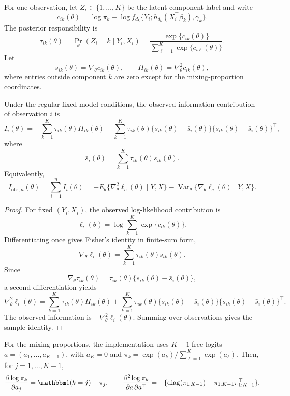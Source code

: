 For one observation, let \(Z_i\in\{1,\ldots,K\}\) be the latent component label
and write
\[
    c_{ik}(\theta)
    =
    \log \pi_k+\log f_{d_k}\{Y_i;h_{d_k}(X_i^\top\beta_k),\gamma_k\}.
\]
The posterior responsibility is
\[
    \tau_{ik}(\theta)
    =
    \Pr_\theta(Z_i=k\mid Y_i,X_i)
    =
    \frac{\exp\{c_{ik}(\theta)\}}
    {\sum_{\ell=1}^K\exp\{c_{i\ell}(\theta)\}}.
\]
Let
\[
    s_{ik}(\theta)=\nabla_\theta c_{ik}(\theta),
    \qquad
    H_{ik}(\theta)=\nabla_\theta^2 c_{ik}(\theta),
\]
where entries outside component \(k\) are zero except for the
mixing-proportion coordinates.

\begin{theorem}
\label{thm:louis}
Under the regular fixed-model conditions, the observed information contribution
of observation \(i\) is
\[
    I_i(\theta)
    =
    -\sum_{k=1}^K\tau_{ik}(\theta)H_{ik}(\theta)
    -
    \sum_{k=1}^K\tau_{ik}(\theta)
    \{s_{ik}(\theta)-\bar s_i(\theta)\}
    \{s_{ik}(\theta)-\bar s_i(\theta)\}^\top,
\]
where
\[
    \bar s_i(\theta)=\sum_{k=1}^K\tau_{ik}(\theta)s_{ik}(\theta).
\]
Equivalently,
\[
    I_{\mathrm{obs},n}(\theta)
    =
    \sum_{i=1}^n I_i(\theta)
    =
    -E_\theta\{\nabla_\theta^2\ell_c(\theta)\mid Y,X\}
    -
    \operatorname{Var}_\theta\{\nabla_\theta\ell_c(\theta)\mid Y,X\}.
\]
\end{theorem}

\begin{proof}
For fixed \((Y_i,X_i)\), the observed log-likelihood contribution is
\[
    \ell_i(\theta)=\log\sum_{k=1}^K\exp\{c_{ik}(\theta)\}.
\]
Differentiating once gives Fisher's identity in finite-sum form,
\[
    \nabla_\theta\ell_i(\theta)
    =
    \sum_{k=1}^K\tau_{ik}(\theta)s_{ik}(\theta).
\]
Since
\[
    \nabla_\theta\tau_{ik}(\theta)
    =
    \tau_{ik}(\theta)\{s_{ik}(\theta)-\bar s_i(\theta)\},
\]
a second differentiation yields
\[
    \nabla_\theta^2\ell_i(\theta)
    =
    \sum_{k=1}^K\tau_{ik}(\theta)H_{ik}(\theta)
    +
    \sum_{k=1}^K\tau_{ik}(\theta)
    \{s_{ik}(\theta)-\bar s_i(\theta)\}
    \{s_{ik}(\theta)-\bar s_i(\theta)\}^\top.
\]
The observed information is \(-\nabla_\theta^2\ell_i(\theta)\).  Summing over
observations gives the sample identity.
\end{proof}

For the mixing proportions, the implementation uses \(K-1\) free logits
\(a=(a_1,\ldots,a_{K-1})\), with \(a_K=0\) and
\(\pi_k=\exp(a_k)/\sum_{\ell=1}^K\exp(a_\ell)\).  Then, for
\(j=1,\ldots,K-1\),
\[
    \frac{\partial\log\pi_k}{\partial a_j}
    =
    \mathbbm 1(k=j)-\pi_j,
    \qquad
    \frac{\partial^2\log\pi_k}{\partial a\,\partial a^\top}
    =
    -\{\operatorname{diag}(\pi_{1:K-1})
    -\pi_{1:K-1}\pi_{1:K-1}^\top\}.
\]

